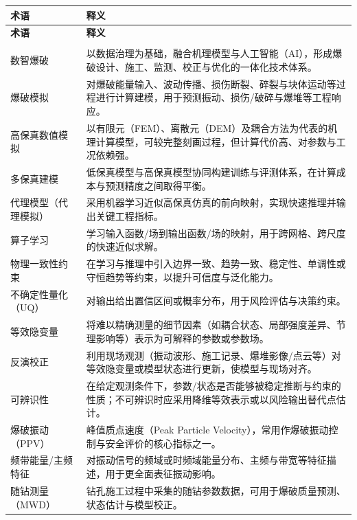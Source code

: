 \documentclass[12pt,a4paper,fontset=mac]{ctexart}
\newcommand{\abbr}[2]{#1（\textsc{#2}）} %
\newcommand{\PPV}{\textsc{PPV}}
\newcommand{\UQ}{\textsc{UQ}}
\newcommand{\MWD}{\textsc{MWD}}
\begin{document}
\begin{longtable}{
  >{\raggedright\arraybackslash}p{3.4cm}
  >{\raggedright\arraybackslash}p{\dimexpr\linewidth-3.4cm-2\tabcolsep\relax}
}
\toprule
\textbf{术语} & \textbf{释义} \\
\midrule
\endfirsthead

\toprule
\textbf{术语} & \textbf{释义} \\
\midrule
\endhead

\midrule
\multicolumn{2}{r}{\small（续下页）} \\
\endfoot

\bottomrule
\endlastfoot

数智爆破 & 以数据治理为基础，融合机理模型与\abbr{人工智能}{AI}，形成爆破设计、施工、监测、校正与优化的一体化技术体系。\\
爆破模拟 & 对爆破能量输入、波动传播、损伤断裂、碎裂与块体运动等过程进行计算建模，用于预测振动、损伤/破碎与爆堆等工程响应。\\
高保真数值模拟 & 以有限元（FEM）、离散元（DEM）及耦合方法为代表的机理计算模型，可较完整刻画过程，但计算代价高、对参数与工况依赖强。\\
多保真建模 & 低保真模型与高保真模型协同构建训练与评测体系，在计算成本与预测精度之间取得平衡。\\
代理模型（代理模拟） & 采用机器学习近似高保真仿真的前向映射，实现快速推理并输出关键工程指标。\\
算子学习 & 学习输入函数/场到输出函数/场的映射，用于跨网格、跨尺度的快速近似求解。\\
物理一致性约束 & 在学习与推理中引入边界一致、趋势一致、稳定性、单调性或守恒趋势等约束，以提升可信度与泛化能力。\\
不确定性量化（\UQ） & 对输出给出置信区间或概率分布，用于风险评估与决策约束。\\
等效隐变量 & 将难以精确测量的细节因素（如耦合状态、局部强度差异、节理影响等）表示为可解释的参数或参数场。\\
反演校正 & 利用现场观测（振动波形、施工记录、爆堆影像/点云等）对等效隐变量或模型状态进行更新，使模型与现场对齐。\\
可辨识性 & 在给定观测条件下，参数/状态是否能够被稳定推断与约束的性质；不可辨识时应采用降维等效表示或以风险输出替代点估计。\\
爆破振动（\PPV） & 峰值质点速度（Peak Particle Velocity），常用作爆破振动控制与安全评价的核心指标之一。\\
频带能量/主频特征 & 对振动信号的频域或时频域能量分布、主频与带宽等特征描述，用于更全面表征振动影响。\\
随钻测量（\MWD） & 钻孔施工过程中采集的随钻参数数据，可用于爆破质量预测、状态估计与模型校正。\\

\end{longtable}
\end{document}
